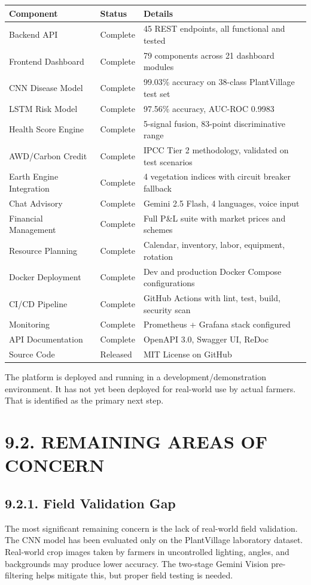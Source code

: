 \documentclass[12pt, a4paper]{report}
\begin{document}
\begin{table}[htbp]
\centering
\small
\begin{tabularx}{\textwidth}{|X|X|X|}
\hline
Component & Status & Details \\
\hline
Backend API & Complete & 45 REST endpoints, all functional and tested \\
Frontend Dashboard & Complete & 79 components across 21 dashboard modules \\
CNN Disease Model & Complete & 99.03\% accuracy on 38-class PlantVillage test set \\
LSTM Risk Model & Complete & 97.56\% accuracy, AUC-ROC 0.9983 \\
Health Score Engine & Complete & 5-signal fusion, 83-point discriminative range \\
AWD/Carbon Credit & Complete & IPCC Tier 2 methodology, validated on test scenarios \\
Earth Engine Integration & Complete & 4 vegetation indices with circuit breaker fallback \\
Chat Advisory & Complete & Gemini 2.5 Flash, 4 languages, voice input \\
Financial Management & Complete & Full P\&L suite with market prices and schemes \\
Resource Planning & Complete & Calendar, inventory, labor, equipment, rotation \\
Docker Deployment & Complete & Dev and production Docker Compose configurations \\
CI/CD Pipeline & Complete & GitHub Actions with lint, test, build, security scan \\
Monitoring & Complete & Prometheus + Grafana stack configured \\
API Documentation & Complete & OpenAPI 3.0, Swagger UI, ReDoc \\
Source Code & Released & MIT License on GitHub \\
\hline
\end{tabularx}
\end{table}

The platform is deployed and running in a development/demonstration environment. It has not yet been deployed for real-world use by actual farmers. That is identified as the primary next step.

\section{9.2. REMAINING AREAS OF CONCERN}
\subsection{9.2.1. Field Validation Gap}
The most significant remaining concern is the lack of real-world field validation. The CNN model has been evaluated only on the PlantVillage laboratory dataset. Real-world crop images taken by farmers in uncontrolled lighting, angles, and backgrounds may produce lower accuracy. The two-stage Gemini Vision pre-filtering helps mitigate this, but proper field testing is needed.
\end{document}
